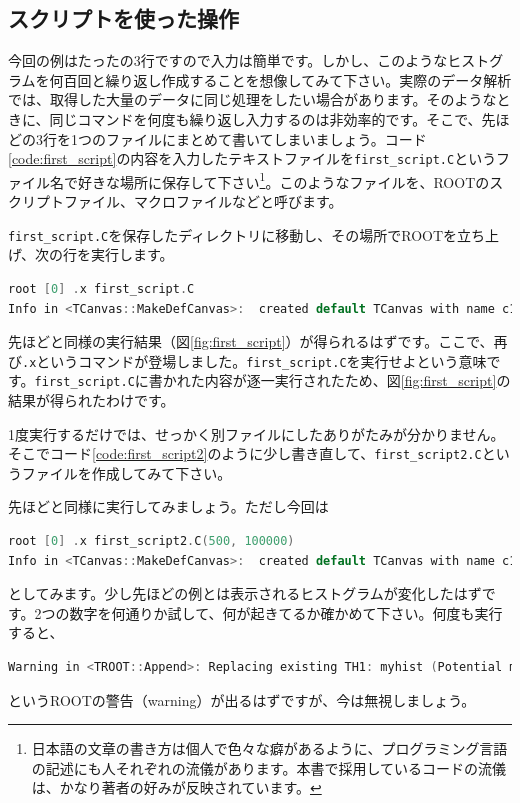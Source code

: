 \subsection{スクリプトを使った操作}
今回の例はたったの3行ですので入力は簡単です。しかし、このようなヒストグラムを何百回と繰り返し作成することを想像してみて下さい。実際のデータ解析では、取得した大量のデータに同じ処理をしたい場合があります。そのようなときに、同じコマンドを何度も繰り返し入力するのは非効率的です。そこで、先ほどの3行を1つのファイルにまとめて書いてしまいましょう。コード\ref{code:first_script}の内容を入力したテキストファイルを\texttt{first\_script.C}というファイル名で好きな場所に保存して下さい\footnote{日本語の文章の書き方は個人で色々な癖があるように、プログラミング言語の記述にも人それぞれの流儀があります。本書で採用しているコードの流儀は、かなり著者の好みが反映されています。}。このようなファイルを、ROOTのスクリプトファイル、マクロファイルなどと呼びます。


\texttt{first\_script.C}を保存したディレクトリに移動し、その場所でROOTを立ち上げ、次の行を実行します。
\begin{lstlisting}[language=c++]
root [0] .x first_script.C
Info in <TCanvas::MakeDefCanvas>:  created default TCanvas with name c1
\end{lstlisting}
先ほどと同様の実行結果（図\ref{fig:first_script}）が得られるはずです。ここで、再び\texttt{.x}というコマンドが登場しました。\texttt{first\_script.C}を実行せよという意味です。\texttt{first\_script.C}に書かれた内容が逐一実行されたため、図\ref{fig:first_script}の結果が得られたわけです。

1度実行するだけでは、せっかく別ファイルにしたありがたみが分かりません。そこでコード\ref{code:first_script2}のように少し書き直して、\texttt{first\_script2.C}というファイルを作成してみて下さい。

先ほどと同様に実行してみましょう。ただし今回は
\begin{lstlisting}[language=c++]
root [0] .x first_script2.C(500, 100000)
Info in <TCanvas::MakeDefCanvas>:  created default TCanvas with name c1
\end{lstlisting}
としてみます。少し先ほどの例とは表示されるヒストグラムが変化したはずです。2つの数字を何通りか試して、何が起きてるか確かめて下さい。何度も実行すると、
\begin{lstlisting}[language=c++]
Warning in <TROOT::Append>: Replacing existing TH1: myhist (Potential memory leak).
\end{lstlisting}
というROOTの警告（warning）が出るはずですが、今は無視しましょう。


